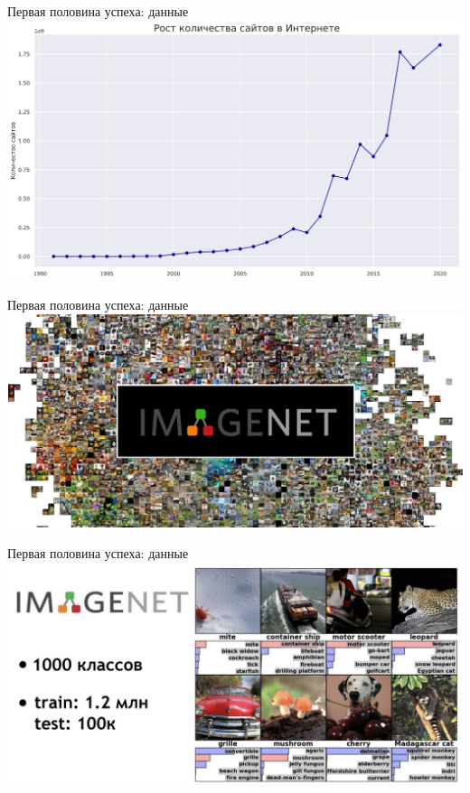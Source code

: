 \documentclass[aspectratio=169]{beamer}
\begin{document}
\begin{frame}{Первая половина успеха: данные}
    \centering
    \includegraphics[width=.84\linewidth]{graphs/fig18.jpg}
\end{frame}

\begin{frame}{Первая половина успеха: данные}
    \centering
    \includegraphics[width=\linewidth]{graphs/fig19.jpg}
\end{frame}

\begin{frame}{Первая половина успеха: данные}
    \centering
    \includegraphics[width=.97\linewidth]{graphs/fig20.jpg}
\end{frame}
\end{document}
